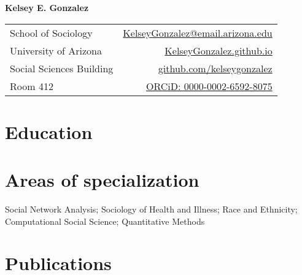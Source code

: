 \documentclass[11pt]{article} %
\begin{document}

{\LARGE\bfseries Kelsey E. Gonzalez} %
\bigskip\bigskip\medskip %
\medskip %



\begin{tabular}{lr}
School of Sociology & 
\href{mailto:KelseyGonzalez@email.arizona.edu}{KelseyGonzalez@email.arizona.edu}
\\
University of Arizona & 
\href{kelseygonzalez.github.io}{KelseyGonzalez.github.io}
\\ 
Social Sciences Building & 
\href{https://github.com/kelseygonzalez}{github.com/kelseygonzalez}
\\
Room 412 & 
\href{https://orcid.org/0000-0002-6592-8075}{ORCiD: 0000-0002-6592-8075}
\\
\end{tabular}

\vspace{0.04\textheight} %


\section*{Education}



\section*{Areas of specialization}
Social Network Analysis; Sociology of Health and Illness; Race and Ethnicity;  \\
Computational Social Science; Quantitative Methods



\section*{Publications}


\end{document}
